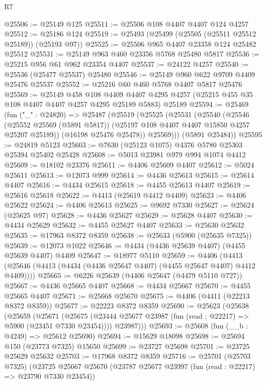\begin{lexlean}{R7}
\begin{coremodule}
@25506 := @25149 @125
@25511 := @25506 @108 @4407 @4407 @124 @4257
@25512 := @25186 @124
@25519 := @25493 (@25499 (@25505 (@25511 @25512 @25189)) (@25193 @97))
@25525 := @25506 @965 @4407 @23358 @124 @25482 @25512
@25531 := @25149 @963 @460 @23356 @5768 @25480 @5817
@25536 := @25215 @956 @61 @962 @23354 @4407
@25537 := @24122 @4257
@25540 := @25536 (@25477 @25537) @25480
@25546 := @25149 @960 @622 @9709 @4409 @25476 @25537
@25552 := @25216 @60 @460 @5768 @4407 @5817 @25476
@25569 := @25149
    @458
    @108
    @4409
    @4407
    @4295
    @4257
    (@25215 @455 @35 @108 @4407 @4407 @4257 @4295 @25189 @5883)
    @25189
@25594 := @25469
    (fun ("_" : @24820) =>
    @25487
      (@25519
        (@25525
          (@25531
            (@25540
              (@25546
                (@25552 @25569 (@5891 @5817))
                (@25197 @108 @4407 @4407 @15850 @4257 @25207 @25189))
              (@16198 @25476 @25478))
            @25569)))
      (@5891 @25484))
@25595 := @24819 @5123
@25603 := @7630 (@25123 @1075) @4376 @5780 @25303 @25394 @25402 @25428
@25608 := @5013 @23981 @979 @994 @1074 @4412
@25609 := @18102 @23376
@25611 := @4406 @25609 @4407
@25612 := @5024 @25611
@25613 := @12073 @999
@25614 := @4436 @25613
@25615 := @25614 @4407
@25616 := @4434 @25615
@25618 := @4455 @25613 @4407
@25619 := @25616 @25618
@25622 := @4413 (@25619 @4412 @4409)
@25623 := @4406 @25622
@25624 := @4406 @25613
@25625 := @9692 @7330
@25627 := @25624 (@25625 @97)
@25628 := @4436 @25627
@25629 := @25628 @4407
@25630 := @4434 @25629
@25632 := @4455 @25627 @4407
@25633 := @25630 @25632
@25635 := @17963 @8372 @8359
@25638 := @25633 (@5900 (@25635 @7325))
@25639 := @12073 @1022
@25646 := @4434 (@4436 @25639 @4407) (@4455 @25639 @4407) @4409
@25647 := @18977 @5110
@25659 := @4406
    (@4413 (@25646 (@4413 (@4434 (@4436 @25647 @4407) (@4455 @25647 @4407) @4412 @4409))))
@25665 := @6226 @25639 (@4406 @25647 (@4479 @5110 @727))
@25667 := @4436 @25665 @4407
@25668 := @4434 @25667
@25670 := @4455 @25665 @4407
@25671 := @25668 @25670
@25675 := @4406 (@4411 (@22213 @8372 @8359))
@25677 := @22223 @8372 @8359
@25690 := @25623
    (@25638
      (@25659
        (@25671
          (@25675 (@23444 @25677 @23987 (fun (read : @22217) => @5900 (@23451 @7330 @23454))))
          @23987)))
@25693 := @25608 (fun (__b : @4249) => @25612 @25690)
@25694 := @15629 @18098
@25698 := @25694 @150 (@23773 @7325) @15650
@25699 := @23727 @25698
@25701 := @23725 @25629 @25632
@25703 := @17968 @8372 @8359
@25716 := @25701
    (@25703 @7325)
    (@23725
      @25667
      @25670
      (@23787 @25677 @23997 (fun (read : @22217) => @23790 @7330 @23454))

\end{coremodule}
\end{lexlean}
